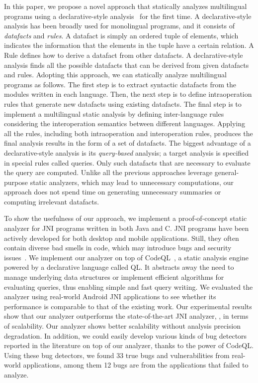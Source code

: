 In this paper, we propose a novel approach that statically analyzes
multilingual programs using a declarative-style analysis~\cite{doop} for the first time.
A declarative-style analysis has been broadly used for monolingual programs,
and it consists of \textit{datafacts} and \textit{rules}.
A datafact is simply an ordered tuple of elements, which indicates the
information that the elements in the tuple have a certain relation.
A Rule defines how to derive a datafact from other datafacts.
A declarative-style analysis finds all the possible datafacts that can
be derived from given datafacts and rules.
Adopting this approach, we can statically analyze multilingual programs as follows.
The first step is to extract syntactic datafacts from the modules written in each language.
Then, the next step is to define intraoperation rules that
generate new datafacts using existing datafacts.
The final step is to implement a multilingual static analysis by defining
inter-language rules considering the interoperation semantics between different languages. 
Applying all the rules, including both intraoperation
and interoperation rules, produces the final analysis results in
the form of a set of datafacts.  The biggest advantage of a declarative-style analysis is its
\textit{query-based} analysis; a target analysis is specified in
special rules called queries. Only such datafacts that are
necessary to evaluate the query are computed.
Unlike all the previous approaches leverage general-purpose static analyzers,
which may lead to unnecessary computations, our approach does not spend time
on generating unnecessary summaries or computing irrelevant datafacts.


To show the usefulness of our approach, we implement a proof-of-concept static
analyzer for JNI programs written in both Java and C.
JNI programs have been actively developed for both desktop and mobile
applications. Still, they often contain diverse bad smells in code,
which may introduce bugs and security
issues~\cite{nishiwaki2012sean, grichi2019state, abidi2019behind, abidi2021multi}.
We implement our analyzer on top of CodeQL~\cite{codeql}, a
static analysis engine powered by a declarative language called QL.
It abstracts away the need to manage underlying data structures or implement
efficient algorithms for evaluating queries, thus enabling simple and fast query writing.
We evaluated the analyzer using real-world Android JNI applications
to see whether its performance is comparable to that of the existing work.
Our experimental results show that our analyzer outperforms the
state-of-the-art JNI analyzer, \lees, in terms of scalability.  Our analyzer
shows better scalability without analysis precision degradation.
In addition,  we could easily develop various kinds of bug detectors
reported in the literature on top of our analyzer, thanks to the power of CodeQL.
Using these bug detectors, we found 33 true bugs and vulnerabilities from
real-world applications, among them 12 bugs are from the applications that \lees
failed to analyze.

